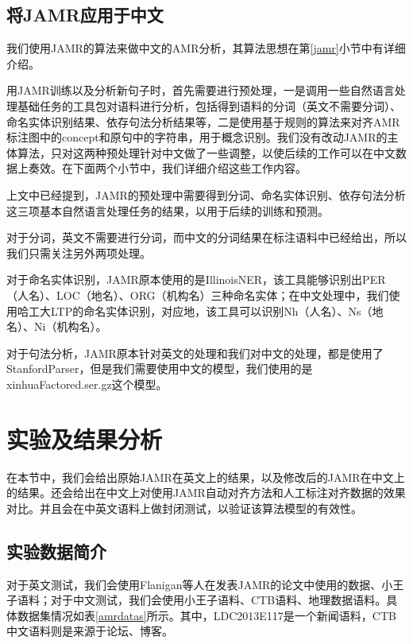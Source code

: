 \documentclass[master, winfont]{njuthesis}
\begin{document}
\subsection{将JAMR应用于中文}
我们使用JAMR的算法来做中文的AMR分析，其算法思想在第\ref{jamr}小节中有详细介绍。

用JAMR训练以及分析新句子时，首先需要进行预处理，一是调用一些自然语言处理基础任务的工具包对语料进行分析，包括得到语料的分词（英文不需要分词）、命名实体识别结果、依存句法分析结果等，二是使用基于规则的算法来对齐AMR标注图中的concept和原句中的字符串，用于概念识别。我们没有改动JAMR的主体算法，只对这两种预处理针对中文做了一些调整，以使后续的工作可以在中文数据上奏效。在下面两个小节中，我们详细介绍这些工作内容。

上文中已经提到，JAMR的预处理中需要得到分词、命名实体识别、依存句法分析这三项基本自然语言处理任务的结果，以用于后续的训练和预测。

对于分词，英文不需要进行分词，而中文的分词结果在标注语料中已经给出，所以我们只需关注另外两项处理。

对于命名实体识别，JAMR原本使用的是IllinoisNER，该工具能够识别出PER（人名）、LOC（地名）、ORG（机构名）三种命名实体；在中文处理中，我们使用哈工大LTP的命名实体识别，对应地，该工具可以识别Nh（人名）、Ns（地名）、Ni（机构名）。

对于句法分析，JAMR原本针对英文的处理和我们对中文的处理，都是使用了StanfordParser，但是我们需要使用中文的模型，我们使用的是xinhuaFactored.ser.gz这个模型。

\section{实验及结果分析}
在本节中，我们会给出原始JAMR在英文上的结果，以及修改后的JAMR在中文上的结果。还会给出在中文上对使用JAMR自动对齐方法和人工标注对齐数据的效果对比。并且会在中英文语料上做封闭测试，以验证该算法模型的有效性。

\subsection{实验数据简介}
对于英文测试，我们会使用Flanigan等人\cite{Flanigan2014}在发表JAMR的论文中使用的数据、小王子语料；对于中文测试，我们会使用小王子语料、CTB语料、地理数据语料。具体数据集情况如表\ref{amrdatas}所示。其中，LDC2013E117是一个新闻语料，CTB中文语料则是来源于论坛、博客。
\end{document}
